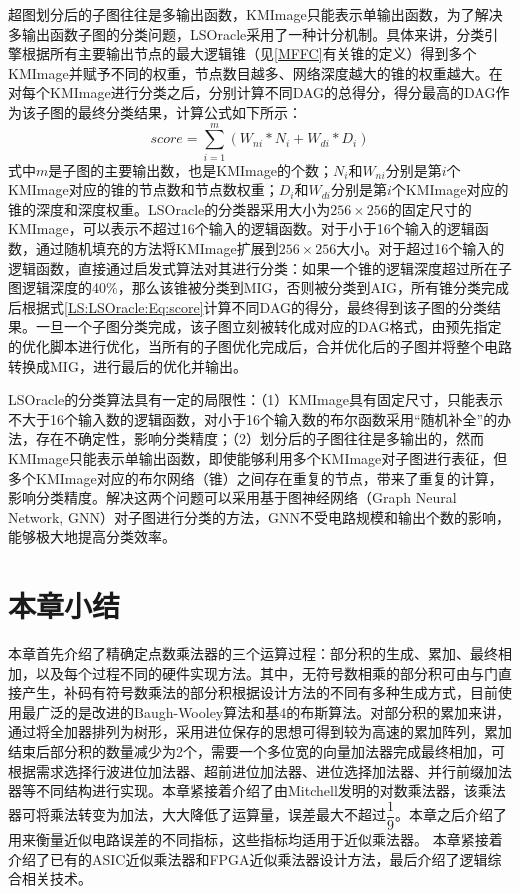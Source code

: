 超图划分后的子图往往是多输出函数，KMImage只能表示单输出函数，为了解决多输出函数子图的分类问题，LSOracle采用了一种计分机制。具体来讲，分类引擎根据所有主要输出节点的最大逻辑锥（见\ref{MFFC}有关锥的定义）得到多个KMImage并赋予不同的权重，节点数目越多、网络深度越大的锥的权重越大。在对每个KMImage进行分类之后，分别计算不同DAG的总得分，得分最高的DAG作为该子图的最终分类结果，计算公式如下所示：
\begin{equation}
\label{LS:LSOracle:Eq:score}
score = \sum_{i=1}^{m} ( W_{ni} * N_i +W_{di} *D_i )
\end{equation}
式中$m$是子图的主要输出数，也是KMImage的个数；$N_i$和$W_{ni}$分别是第$i$个KMImage对应的锥的节点数和节点数权重；$D_i$和$W_{di}$分别是第$i$个KMImage对应的锥的深度和深度权重。LSOracle的分类器采用大小为$256 \times 256$的固定尺寸的KMImage，可以表示不超过16个输入的逻辑函数。对于小于16个输入的逻辑函数，通过随机填充的方法将KMImage扩展到$256 \times 256$大小。对于超过16个输入的逻辑函数，直接通过启发式算法对其进行分类：如果一个锥的逻辑深度超过所在子图逻辑深度的40\%，那么该锥被分类到MIG，否则被分类到AIG，所有锥分类完成后根据式\eqref{LS:LSOracle:Eq:score}计算不同DAG的得分，最终得到该子图的分类结果。一旦一个子图分类完成，该子图立刻被转化成对应的DAG格式，由预先指定的优化脚本进行优化，当所有的子图优化完成后，合并优化后的子图并将整个电路转换成MIG，进行最后的优化并输出。

LSOracle的分类算法具有一定的局限性：（1）KMImage具有固定尺寸，只能表示不大于16个输入数的逻辑函数，对小于16个输入数的布尔函数采用“随机补全”的办法，存在不确定性，影响分类精度；（2）划分后的子图往往是多输出的，然而KMImage只能表示单输出函数，即使能够利用多个KMImage对子图进行表征，但多个KMImage对应的布尔网络（锥）之间存在重复的节点，带来了重复的计算，影响分类精度。解决这两个问题可以采用基于图神经网络（Graph Neural Network, GNN）对子图进行分类的方法，GNN不受电路规模和输出个数的影响，能够极大地提高分类效率。



\section{本章小结}

本章首先介绍了精确定点数乘法器的三个运算过程：部分积的生成、累加、最终相加，以及每个过程不同的硬件实现方法。其中，无符号数相乘的部分积可由与门直接产生，补码有符号数乘法的部分积根据设计方法的不同有多种生成方式，目前使用最广泛的是改进的Baugh-Wooley算法和基4的布斯算法。对部分积的累加来讲，通过将全加器排列为树形，采用进位保存的思想可得到较为高速的累加阵列，累加结束后部分积的数量减少为2个，需要一个多位宽的向量加法器完成最终相加，可根据需求选择行波进位加法器、超前进位加法器、进位选择加法器、并行前缀加法器等不同结构进行实现。本章紧接着介绍了由Mitchell发明的对数乘法器，该乘法器可将乘法转变为加法，大大降低了运算量，误差最大不超过$\dfrac{1}{9}$。本章之后介绍了用来衡量近似电路误差的不同指标，这些指标均适用于近似乘法器。
本章紧接着介绍了已有的ASIC近似乘法器和FPGA近似乘法器设计方法，最后介绍了逻辑综合相关技术。